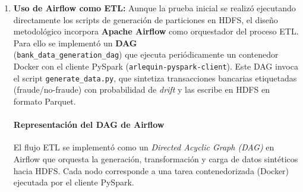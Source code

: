 \begin{enumerate}
    \item \textbf{Uso de Airflow como ETL:}
    Aunque la prueba inicial se realizó ejecutando directamente los scripts de generación de particiones en HDFS, 
    el diseño metodológico incorpora \textbf{Apache Airflow} como orquestador del proceso ETL. 
    Para ello se implementó un \textbf{DAG} \\ (\texttt{bank\_data\_generation\_dag}) que ejecuta periódicamente 
    un contenedor Docker con el cliente PySpark (\texttt{arlequin-pyspark-client}). 
    Este DAG invoca el script \texttt{generate\_data.py}, que sintetiza transacciones bancarias etiquetadas (fraude/no-fraude) con 
    probabilidad de \textit{drift} y las escribe en HDFS en formato Parquet.

   \paragraph{Representación del DAG de Airflow}
    El flujo ETL se implementó como un \textit{Directed Acyclic Graph (DAG)} en Airflow que orquesta la generación, transformación y carga de datos sintéticos hacia HDFS. Cada nodo corresponde a una tarea contenedorizada (Docker) ejecutada por el cliente PySpark.
    
    \begin{figure}[htbp]
    \centering
\end{figure}
\end{enumerate}

